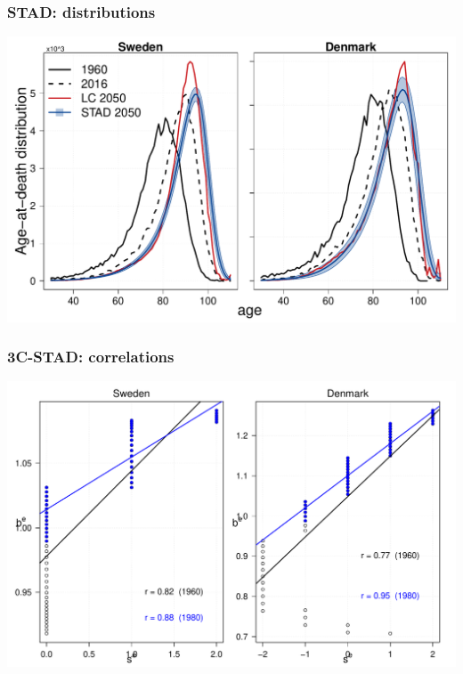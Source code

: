 \documentclass[12pt, xcolor=table]{beamer}  %
\begin{document}
\begin{frame}[noframenumbering]\frametitle{STAD: distributions}

\vspace{-0.5cm}
	
	\begin{center}	
		\vspace{0.2cm}
		
		\includegraphics[scale=.42]{Figures/Ch2/F7}
		
	\end{center}
	
\end{frame}



\begin{frame}[noframenumbering]\frametitle{3C-STAD: correlations}

\vspace{-0.5cm}
	
	
	\begin{center}	
		\vspace{0.2cm}
		
		\includegraphics[scale=.42]{Figures/Ch3/F_CORR_EA}
		
	\end{center}
	
\end{frame}
\end{document}
